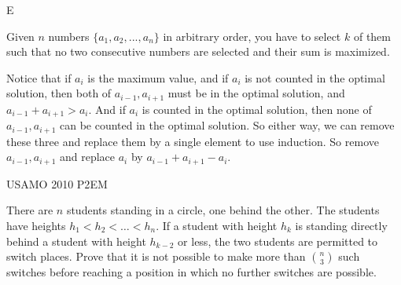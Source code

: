 

\prob{}
{}{E}{
    Given $ n $ numbers $ \{a_1, a_2, ..., a_n\} $ in arbitrary order, you
    have to select $ k $ of them such that no two consecutive numbers are
    selected and their sum is maximized.

}\label{problem:constructive_algo_6}\label{problem:swapping_3}

\begin{solution}
    Notice that if $ a_i $ is the maximum value, and if $ a_i $ is not
    counted in the optimal solution, then both of $ a_{i-1}, a_{i+1} $ must be in
    the optimal solution, and $ a_{i-1} + a_{i+1} > a_i $. And if $ a_i $ is
    counted in the optimal solution, then none of $ a_{i-1}, a_{i+1} $ can be
    counted in the optimal solution. So either way, we can remove these three and
    replace them by a single element to use induction. So remove $ a_{i-1},
    a_{i+1} $ and replace $ a_i $ by $ a_{i-1} + a_{i+1} - a_i $.
\end{solution}


{USAMO 2010 P2}{EM}{
    There are $n$ students standing in a circle, one behind the other. The
    students have heights $h_1<h_2<\dots <h_n$. If a student with height $h_k$ is
    standing directly behind a student with height $h_{k-2}$ or less, the two
    students are permitted to switch places. Prove that it is not possible to make
    more than $\binom{n}{3}$ such switches before reaching a position in which no
    further switches are possible.

}

